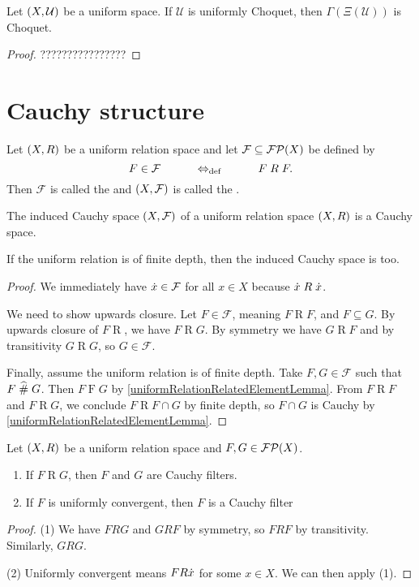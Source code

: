 \begin{lemma}
Let $\sSet{X,\mathcal{U}}$ be a uniform space. If $\mathcal{U}$ is uniformly Choquet, then $\Gamma(\Xi(\mathcal{U}))$ is Choquet.
\end{lemma}
\begin{proof}
????????????????
\end{proof}


\section{Cauchy structure}
\begin{definition}
Let $\sSet{X,R}$ be a uniform relation space and let $\mathcal{F}\subseteq \operatorname{\mathcal{FP}}(X)$ be defined by
\[ F\in \mathcal{F} \qquad\quad\Leftrightarrow_{\text{def}}\quad\qquad F\mathrel{R} F. \]
Then $\mathcal{F}$ is called the  and $\sSet{X,\mathcal{F}}$ is called the .
\end{definition}
\begin{lemma}
The induced Cauchy space $\sSet{X, \mathcal{F}}$ of a uniform relation space $\sSet{X,R}$ is a Cauchy space.

If the uniform relation is of finite depth, then the induced Cauchy space is too.
\end{lemma}
\begin{proof}
We immediately have $\dot{x}\in\mathcal{F}$ for all $x\in X$ because $\dot{x}\mathrel{R} \dot{x}$.

We need to show upwards closure. Let $F\in \mathcal{F}$, meaning $F\mathrel{R} F$, and $F\subseteq G$. By upwards closure of $F\mathrel{R}$, we have $F\mathrel{R} G$. By symmetry we have $G\mathrel{R} F$ and by transitivity $G\mathrel{R} G$, so $G\in\mathcal{F}$.

Finally, assume the uniform relation is of finite depth. Take $F,G\in \mathcal{F}$ such that $F\mathrel{\widehat{\#}} G$. Then $F\mathrel{F}G$ by \ref{uniformRelationRelatedElementLemma}.
From $F\mathrel{R}F$ and $F\mathrel{R}G$, we conclude $F\mathrel{R}F\cap G$ by finite depth, so $F\cap G$ is Cauchy by \ref{uniformRelationRelatedElementLemma}.
\end{proof}

\begin{lemma} \label{uniformlyConvergentImpliesCauchy}
Let $\sSet{X, R}$ be a uniform relation space and $F,G\in\operatorname{\mathcal{FP}}(X)$.
\begin{enumerate}
\item If $F\mathrel{R}G$, then $F$ and $G$ are Cauchy filters.
\item If $F$ is uniformly convergent, then $F$ is a Cauchy filter
\end{enumerate}
\end{lemma}
\begin{proof}
(1) We have $FRG$ and $GRF$ by symmetry, so $FRF$ by transitivity. Similarly, $GRG$.

(2) Uniformly convergent means $FR\dot{x}$ for some $x\in X$. We can then apply (1).
\end{proof}

